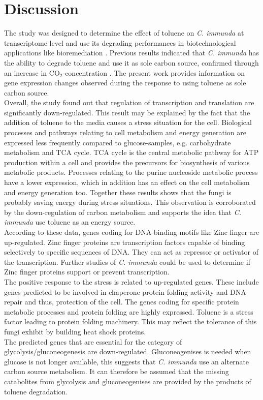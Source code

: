 \documentclass[12pt, a4paper]{report}
\begin{document}
\chapter*{Discussion}
The study was designed to determine the effect of toluene on \textit{C. immunda} at transcriptome level and use its degrading performances in biotechnological applications like bioremediation \cite{BarbaraBlasi2015}. Previous results indicated that \textit{C. immunda} has the ability to degrade toluene and use it as sole carbon source, confirmed through an increase in CO$_2$-concentration \cite{Poyntner2014}. The present work provides information on gene expression changes observed during the response to using toluene as sole carbon source.\\
Overall, the study found out that regulation of transcription and translation are significantly down-regulated. This result may be explained by the fact that the addition of toluene to the media causes a stress situation for the cell. Biological processes and pathways relating to cell metabolism and energy generation are expressed less frequently compared to glucose-samples, e.g. carbohydrate metabolism and TCA cycle. TCA cycle is the central metabolic pathway for ATP production within a cell and provides the precursors for biosynthesis of various metabolic products. Processes relating to the purine nucleoside metabolic process have a lower expression, which in addition has an effect on the cell metabolism and energy generation too. Together these results shows that the fungi is probably saving energy during stress situations. This observation is corroborated by the down-regulation of carbon metabolism and supports the idea that \textit{C. immunda} use toluene as an energy source. \\
According to these data, genes coding for DNA-binding motifs like Zinc finger are up-regulated. Zinc finger proteins are transcription factors capable of binding selectively to specific sequences of DNA. They can act as repressor or activator of the transcription. Further studies of \textit{C. immunda} could be used to determine if Zinc finger proteins support or prevent transcription. \\
The positive response to the stress is related to up-regulated genes. These include genes predicted to be involved in chaperone protein folding activity and DNA repair and thus, protection of the cell. The genes coding for specific protein metabolic processes and protein folding are highly expressed. Toluene is a stress factor leading to protein folding machinery. This may reflect the tolerance of this fungi exhibit by building heat shock proteins. \\
The predicted genes that are essential for the category of glycolysis/gluconeogenesis are down-regulated. 
Gluconeogenises is needed when glucose is not longer available, this suggests that \textit{C. immunda} use an alternate carbon source metabolism. It can therefore be assumed that the missing catabolites from glycolysis and gluconeogenises are provided by the products of toluene degradation.\\
\end{document}
